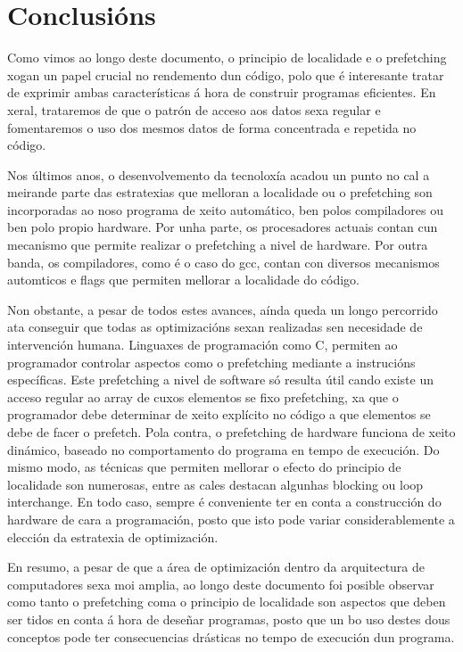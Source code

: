 \documentclass[letterpaper, 10 pt,spanish, conference]{ieeeconf}  %
\begin{document}
\section{Conclusións}

Como vimos ao longo deste documento, o principio de localidade e o prefetching xogan un papel crucial no rendemento dun código, polo que é interesante tratar de exprimir ambas características á hora de construir programas eficientes. En xeral, trataremos de que o patrón de acceso aos datos sexa regular e fomentaremos o uso dos mesmos datos de forma concentrada e repetida no código.

Nos últimos anos, o desenvolvemento da tecnoloxía acadou un punto no cal a meirande parte das estratexias que melloran a localidade ou o prefetching son incorporadas ao noso programa de xeito automático, ben polos compiladores ou ben polo propio hardware. Por unha parte, os procesadores actuais contan cun mecanismo que permite realizar o prefetching a nivel de hardware. Por outra banda, os compiladores, como é o caso do gcc, contan con diversos mecanismos automticos e flags que permiten mellorar a localidade do código.

Non obstante, a pesar de todos estes avances, aínda queda un longo percorrido ata conseguir que todas as optimizacións sexan realizadas sen necesidade de intervención humana. Linguaxes de programación como C, permiten ao programador controlar aspectos como o prefetching mediante a instrucións específicas. Este prefetching a nivel de software só resulta útil cando existe un acceso regular ao array de cuxos elementos se fixo prefetching, xa que o programador debe determinar de xeito explícito no código a que elementos se debe de facer o prefetch. Pola contra, o prefetching de hardware funciona de xeito dinámico, baseado no comportamento do programa en tempo de execución. Do mismo modo, as técnicas que permiten mellorar o efecto do principio de localidade son numerosas, entre as cales destacan algunhas blocking ou loop interchange. En todo caso, sempre é conveniente ter en conta a construcción do hardware de cara a programación, posto que isto pode variar considerablemente a elección da estratexia de optimización.

En resumo, a pesar de que a área de optimización dentro da arquitectura de computadores sexa moi amplia, ao longo deste documento foi posible observar como tanto o prefetching coma o principio de localidade son aspectos que deben ser tidos en conta á hora de deseñar programas, posto que un bo uso destes dous conceptos pode ter consecuencias drásticas no tempo de execución dun programa.
\end{document}
